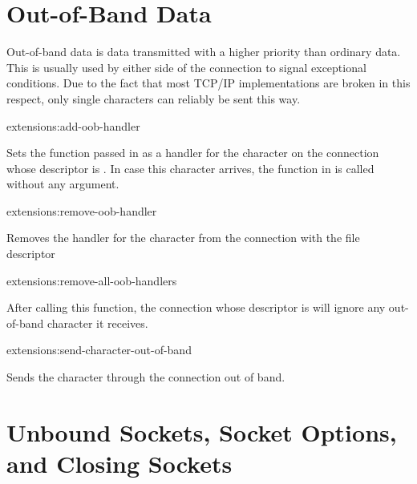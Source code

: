 \section{Out-of-Band Data}
\label{internet-oob}

Out-of-band data is data transmitted with a higher priority than
ordinary data. This is usually used by either side of the connection
to signal exceptional conditions. Due to the fact that most TCP/IP
implementations are broken in this respect, only single characters can
reliably be sent this way.

\begin{defun}{extensions:}{add-oob-handler}{%
    }
  
  Sets the function passed in  as a handler for the
  character  on the connection whose descriptor is .
  In case this character arrives, the function in  is
  called without any argument.

\end{defun}

\begin{defun}{extensions:}{remove-oob-handler}{%
    }
  
  Removes the handler for the character  from the connection
  with the file descriptor 

\end{defun}

\begin{defun}{extensions:}{remove-all-oob-handlers}{%
    }

  After calling this function, the connection whose descriptor is
   will ignore any out-of-band character it receives.

\end{defun}

\begin{defun}{extensions:}{send-character-out-of-band}{%
    }

  Sends the character  through the connection  out
  of band.

\end{defun}

\section{Unbound Sockets, Socket Options, and Closing Sockets}

